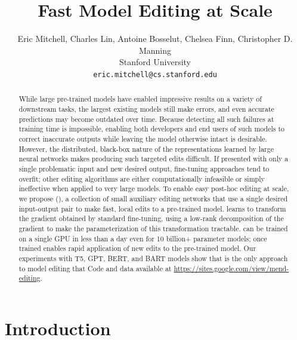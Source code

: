 \documentclass{article}
\title{Fast Model Editing at Scale}
\author{Eric Mitchell, Charles Lin, Antoine Bosselut, Chelsea Finn, Christopher D. Manning\\Stanford University\\\texttt{eric.mitchell@cs.stanford.edu}}
\begin{document}
\maketitle

\begin{abstract}
    While large pre-trained models have enabled impressive results on a variety of downstream tasks, the largest existing models still make errors, and even accurate predictions may become outdated over time. Because detecting all such failures at training time is impossible, enabling both developers and end users of such models to correct inaccurate outputs while leaving the model otherwise intact is desirable. However, the distributed, black-box nature of the representations learned by large neural networks makes producing such targeted edits difficult. If presented with only a single problematic input and new desired output, fine-tuning approaches tend to overfit; other editing algorithms are either computationally infeasible or simply ineffective when applied to very large models. To enable easy post-hoc editing at scale, we propose {\fullname} (\name), a collection of small auxiliary editing networks that use a single desired input-output pair to make fast, local edits to a pre-trained model. {\name} learns to transform the gradient obtained by standard fine-tuning, using a low-rank decomposition of the gradient to make the parameterization of this transformation tractable. {\name} can be trained on a single GPU in less than a day even for 10 billion+ parameter models; once trained {\name} enables rapid application of new edits to the pre-trained model. Our experiments with T5, GPT, BERT, and BART models show that {\name} is the only approach to model editing that  Code and data available at \href{https://sites.google.com/view/mend-editing}{https://sites.google.com/view/mend-editing}.
\end{abstract}

\section{Introduction}
\label{sec:intro}


\end{document}
